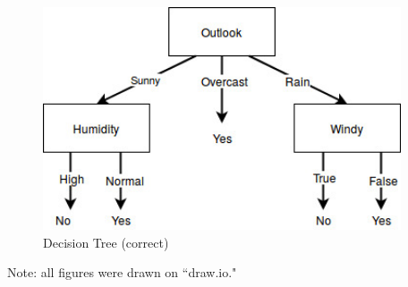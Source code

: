 \documentclass[12pt]{article}
\begin{document}
	\begin{figure}[H]
		\begin{center}
			\includegraphics[width=300pt]{hw3_ml_tree2.jpg}
			\caption{Decision Tree (correct)}
			\label{fig:tree2}
		\end{center}
	\end{figure}
	Note: all figures were drawn on ``draw.io."
	
\end{document}
